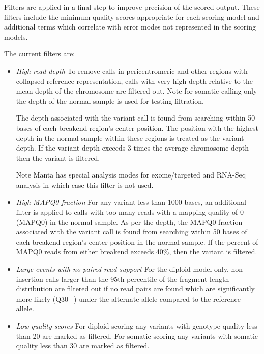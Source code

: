 \documentclass{article}
\begin{document}
Filters are applied in a final step to improve precision of the scored output. These filters include the minimum quality scores appropriate for each scoring model and additional terms which correlate with error modes not represented in the scoring models.

The current filters are:

\begin{itemize}

\item \textit{High read depth} To remove calls in pericentromeric and other regions with collapsed reference representation, calls with very high depth relative to the mean depth of the chromosome are filtered out. Note for somatic calling only the depth of the normal sample is used for testing filtration.

The depth associated with the variant call is found from searching within 50 bases of each breakend region's center position. The position with the highest depth in the normal sample within these regions is treated as the variant depth. If the variant depth exceeds 3 times the average chromosome depth then the variant is filtered.

Note Manta has special analysis modes for exome/targeted and RNA-Seq analysis in which case this filter is not used.

\item \textit{High MAPQ0 fraction} For any variant less than 1000 bases, an additional filter is applied to calls with too many reads with a mapping quality of 0 (MAPQ0) in the normal sample. As per the depth, the MAPQ0 fraction associated with the variant call is found from searching within 50 bases of each breakend region's center position in the normal sample. If the percent of MAPQ0 reads from either breakend exceeds 40\%, then the variant is filtered.

\item \textit{Large events with no paired read support} For the diploid model only, non-insertion calls larger than the 95th percentile of the fragment length distribution are filtered out if no read pairs are found which are significantly more likely (Q30+) under the alternate allele compared to the reference allele.

\item \textit{Low quality scores} For diploid scoring any variants with genotype quality less than 20 are marked as filtered. For somatic scoring any variants with somatic quality less than 30 are marked as filtered.

\end{itemize}




\end{document}
